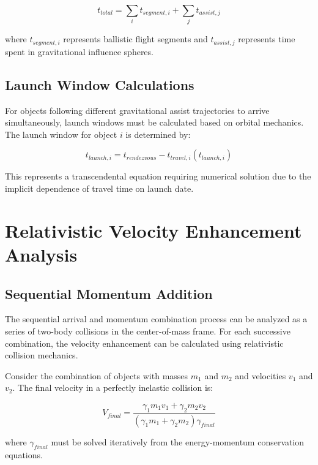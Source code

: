 \documentclass[11pt,a4paper]{article}
\theoremstyle{remark}
\begin{document}
\begin{equation}
t_{total} = \sum_{i} t_{segment,i} + \sum_{j} t_{assist,j}
\label{eq:total_travel_time}
\end{equation}

where $t_{segment,i}$ represents ballistic flight segments and $t_{assist,j}$ represents time spent in gravitational influence spheres.

\subsection{Launch Window Calculations}

For objects following different gravitational assist trajectories to arrive simultaneously, launch windows must be calculated based on orbital mechanics. The launch window for object $i$ is determined by:

\begin{equation}
t_{launch,i} = t_{rendezvous} - t_{travel,i}(t_{launch,i})
\label{eq:launch_window}
\end{equation}

This represents a transcendental equation requiring numerical solution due to the implicit dependence of travel time on launch date.

\section{Relativistic Velocity Enhancement Analysis}

\subsection{Sequential Momentum Addition}

The sequential arrival and momentum combination process can be analyzed as a series of two-body collisions in the center-of-mass frame. For each successive combination, the velocity enhancement can be calculated using relativistic collision mechanics.

Consider the combination of objects with masses $m_1$ and $m_2$ and velocities $v_1$ and $v_2$. The final velocity in a perfectly inelastic collision is:

\begin{equation}
V_{final} = \frac{\gamma_1 m_1 v_1 + \gamma_2 m_2 v_2}{(\gamma_1 m_1 + \gamma_2 m_2)\gamma_{final}}
\label{eq:two_body_final_velocity}
\end{equation}

where $\gamma_{final}$ must be solved iteratively from the energy-momentum conservation equations.
\end{document}
